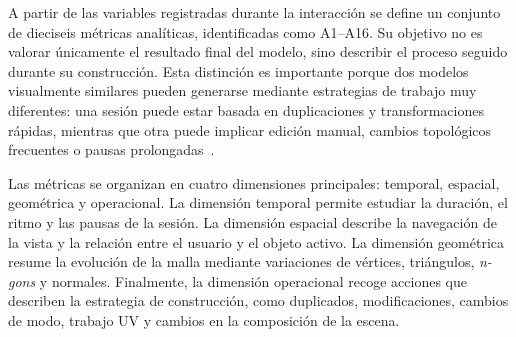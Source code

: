 A partir de las variables registradas durante la interacción se define un conjunto de dieciseis métricas analíticas, identificadas como A1--A16. Su objetivo no es valorar únicamente el resultado final del modelo, sino describir el proceso seguido durante su construcción. Esta distinción es importante porque dos modelos visualmente similares pueden generarse mediante estrategias de trabajo muy diferentes: una sesión puede estar basada en duplicaciones y transformaciones rápidas, mientras que otra puede implicar edición manual, cambios topológicos frecuentes o pausas prolongadas~\cite{gao2021,gao2023}.

Las métricas se organizan en cuatro dimensiones principales: temporal, espacial, geométrica y operacional. La dimensión temporal permite estudiar la duración, el ritmo y las pausas de la sesión. La dimensión espacial describe la navegación de la vista y la relación entre el usuario y el objeto activo. La dimensión geométrica resume la evolución de la malla mediante variaciones de vértices, triángulos, \textit{n-gons} y normales. Finalmente, la dimensión operacional recoge acciones que describen la estrategia de construcción, como duplicados, modificaciones, cambios de modo, trabajo UV y cambios en la composición de la escena.

